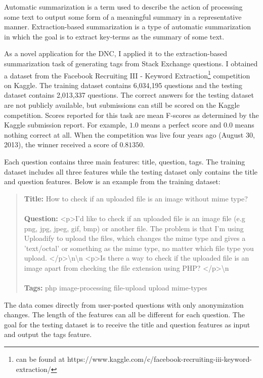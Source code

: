 Automatic summarization is a term used to describe the action of processing
some text to output some form of a meaningful summary in a representative
manner. Extraction-based summarization is a type of automatic summarization in
which the goal is to extract key-terms as the summary of some text.

As a novel application for the DNC, I applied it to the extraction-based
summarization task of generating tags from Stack Exchange questions. I obtained
a dataset from the Facebook Recruiting III - Keyword Extraction\footnote{can be
found at https://www.kaggle.com/c/facebook-recruiting-iii-keyword-extraction/}
competition on Kaggle. The training dataset contains 6,034,195 questions and
the testing dataset contains 2,013,337 questions. The correct answers for the
testing dataset are not publicly available, but submissions can still be scored
on the Kaggle competition. Scores reported for this task are mean F-scores as
determined by the Kaggle submission report. For example, $1.0$ means a perfect
score and $0.0$ means nothing correct at all. When the competition was live
four years ago (August 30, 2013), the winner received a score of $0.81350$.

Each question contains three main features: title, question, tags. The training
dataset includes all three features while the testing dataset only contains the
title and question features. Below is an example from the training dataset:
\blockquote{
\textbf{Title:} How to check if an uploaded file is an image without mime type?
\\ \\
\textbf{Question:} {\textless}p{\textgreater}I'd like to check if an uploaded
file is an image file (e.g png, jpg, jpeg, gif, bmp) or another file. The
problem is that I'm using Uploadify to upload the files, which changes the mime
type and gives a 'text/octal' or something as the mime type, no matter which
file type you upload.%
{\textless}/p{\textgreater}{\textbackslash}n{\textbackslash}n%
{\textless}p{\textgreater}Is there a way to check if the uploaded file is an
image apart from checking the file extension using PHP?%
{\textless}/p{\textgreater}{\textbackslash}n
\\ \\
\textbf{Tags:} php image-processing file-upload upload mime-types}
The data comes directly from user-posted questions with only anonymization
changes. The length of the features can all be different for each question. The
goal for the testing dataset is to receive the title and question features as
input and output the tags feature.
